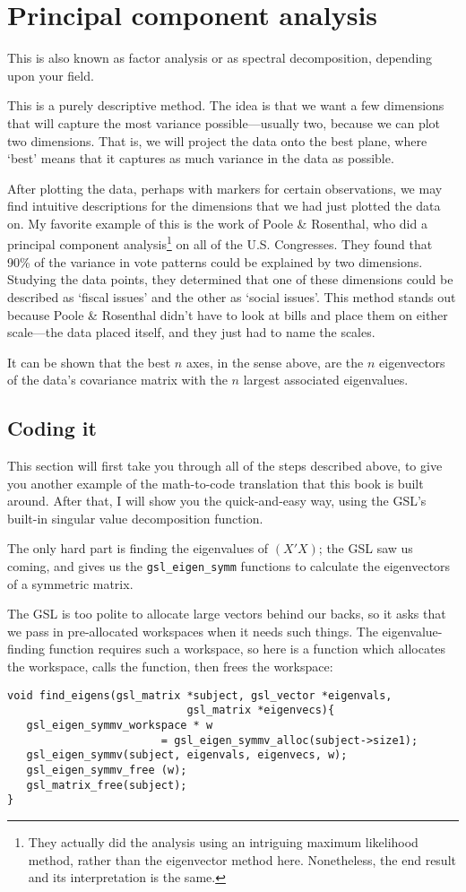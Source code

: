\section{Principal component analysis} This is also known as factor
analysis or as spectral decomposition, depending upon your field. 

This is a purely descriptive method.  The idea is that we want a few
dimensions that will capture the most variance possible---usually two,
because we can plot two dimensions. That is, we will project the data
onto the best plane, where `best' means that it captures as much
variance in the data as possible.

After plotting the data, perhaps with markers for certain observations,
we may find intuitive descriptions for the dimensions that we had just plotted the
data on. My favorite example of this is the work of Poole \& Rosenthal,
who did a principal component analysis\footnote{They actually did
the analysis using an intriguing maximum likelihood method, rather
than the eigenvector method here. Nonetheless, the end result and its
interpretation is the same.} on all of the U.S. Congresses. They found
that 90\% of the variance in vote patterns could be explained by two dimensions.
Studying the data points, they determined that one of these dimensions could be
described as `fiscal issues' and the other as `social issues'. This method stands
out because Poole \& Rosenthal didn't have to look at bills and place them on
either scale---the data placed itself, and they just had to name the scales.


It can be shown that the best $n$ axes, in the sense above, are the
$n$ eigenvectors of the data's covariance matrix with the $n$ largest
associated eigenvalues.

\subsection{Coding it}
This section will first take you through all of the steps described above, to give you another example
of the math-to-code translation that this book is built around. After that, I will show you the quick-and-easy
way, using the GSL's built-in singular value decomposition function.

The only hard part is finding the eigenvalues of
$(X'X)$; the GSL saw us coming, and gives us the {\tt gsl\_eigen\_symm} functions
to calculate the eigenvectors of a symmetric matrix.

The GSL is too polite to allocate large vectors behind our backs, so
it asks that we pass in pre-allocated workspaces when it needs such
things. The eigenvalue-finding function requires such a workspace, so
here is a function which allocates the workspace, calls the function,
then frees the workspace:
\begin{verbatim}
void find_eigens(gsl_matrix *subject, gsl_vector *eigenvals, 
                            gsl_matrix *eigenvecs){
   gsl_eigen_symmv_workspace * w 
                        = gsl_eigen_symmv_alloc(subject->size1);
   gsl_eigen_symmv(subject, eigenvals, eigenvecs, w);
   gsl_eigen_symmv_free (w);
   gsl_matrix_free(subject);
}
\end{verbatim}

